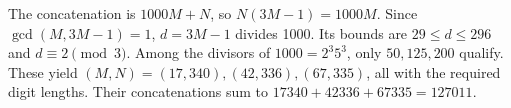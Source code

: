 The concatenation is $1000M+N$, so $N(3M-1)=1000M$. Since $\gcd(M,3M-1)=1$, $d=3M-1$ divides 1000. Its bounds are $29\le d\le296$ and $d\equiv2\pmod3$. Among the divisors of $1000=2^3 5^3$, only $50,125,200$ qualify. These yield $(M,N)=(17,340),(42,336),(67,335)$, all with the required digit lengths. Their concatenations sum to $17340+42336+67335=\boxed{127011}$.
